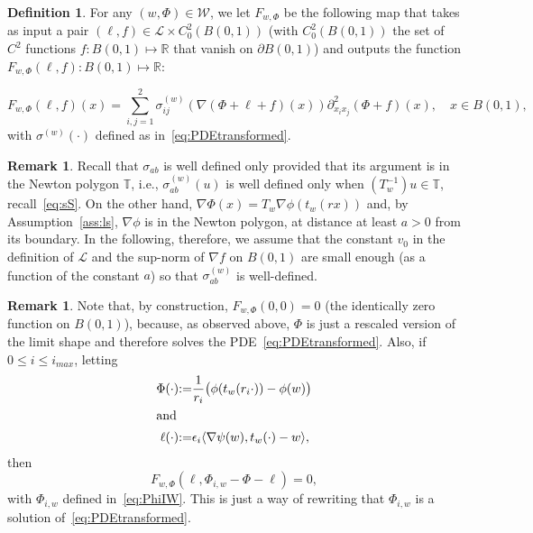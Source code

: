 \documentclass[10pt]{amsart}
\theoremstyle{definition}\newtheorem{defi}[theo]{Definition}\newtheorem{rema}[theo]{Remark}\newtheorem{exam}[theo]{Example}\newtheorem{exem}[theo]{Example}\newtheorem{nota}[theo]{Notation}
\newcommand{\R}{\mathbb{R}}
\newcommand{\bbT}{\mathbb{T}}
\newcommand{\clL}{\mathcal{L}}
\newcommand{\clW}{\mathcal{W}}
\newcommand{\eps}{\epsilon}
\begin{document}
\begin{defi}
For any $(w, \Phi)\in \clW$, we let $ F_{w, \Phi}$ be the following map that takes as input a pair $(\ell,f)\in\clL\times C^2_0(B(0,1)) $ (with $C^2_0(B(0,1))$ the set of $C^2$ functions $f:B(0,1)\mapsto \R$ that vanish on $\partial B(0,1)$) and outputs the function $F_{w,\Phi}(\ell,f):B(0,1)\mapsto \R$:

\begin{equation}\label{riva}
F_{w,\Phi}(\ell,f)(x)= \sum_{i,j=1}^2 \sigma^{(w)}_{ij}(\nabla(\Phi+\ell+f)(x))\partial^2_{x_i x_j}(\Phi+f)(x), \quad x\in B(0,1),
\end{equation}
with $\sigma^{(w)}(\cdot)$ defined as in~\eqref{eq:PDEtransformed}.
\end{defi}
\begin{rema}\label{rem:r0}
Recall that $\sigma_{ab}$ is well defined only provided that its argument is in the Newton polygon $\bbT$, i.e., $\sigma_{ab}^{(w)}(u)$ is well defined only when $(T_w^{-1})u\in\bbT $, recall~\eqref{eq:sS}. On the other hand, $\nabla \Phi (x)=T_w \nabla \phi(t_w(r x))$ and, by Assumption~\ref{ass:ls}, $\nabla\phi$ is in the Newton polygon, at distance at least $a>0$ from its boundary. In the following, therefore, we assume that the constant $v_0$ in the definition of $\clL$ and the sup-norm of $\nabla f$ on $B(0,1)$ are small enough (as a function of the constant $a$) so that $\sigma_{ab}^{(w)}$ is well-defined.
\end{rema}


\begin{rema}\label{rem:ms}
Note that, by construction, $F_{w,\Phi}(0,0)=0$ (the identically zero function on $B(0,1)$), because, as observed above, $\Phi$ is just a rescaled version of the limit shape and therefore solves the PDE~\eqref{eq:PDEtransformed}. Also, if $0\le i\le i_{max}$, letting
\begin{align}
\Phi(\cdot) &{:=}\frac1{r_i}\big(\phi(t_w(r_i\cdot))-\phi(w)\big)\label{eq:wayofre}
\\
\intertext{and}
\ell(\cdot) &{:=} \eps_i \langle \nabla \psi(w), t_w(\cdot)-w \rangle,\label{ltw}
\end{align}
then
\begin{equation}
F_{w, \Phi}(\ell, \Phi_{i,w} -
\Phi-\ell) = 0,
\end{equation}
with $\Phi_{i,w}$ defined in~\eqref{eq:PhiIW}. This is just a way of rewriting that $\Phi_{i,w}$ is a solution of~\eqref{eq:PDEtransformed}.
\end{rema}
\end{document}
